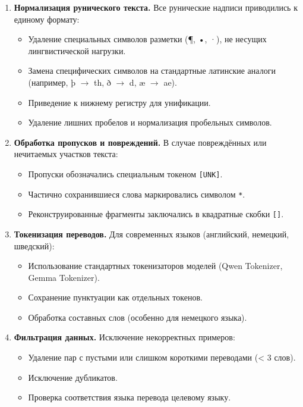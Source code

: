 \documentclass[14pt,a4paper]{extreport}
\begin{document}
\begin{enumerate}
    \item \textbf{Нормализация рунического текста.} Все рунические надписи приводились к единому формату:
    \begin{itemize}
        \item Удаление специальных символов разметки (¶, •, ·), не несущих лингвистической нагрузки.
        \item Замена специфических символов на стандартные латинские аналоги (например, þ $\to$ th, ð $\to$ d, æ $\to$ ae).
        \item Приведение к нижнему регистру для унификации.
        \item Удаление лишних пробелов и нормализация пробельных символов.
    \end{itemize}
    
    \item \textbf{Обработка пропусков и повреждений.} В случае повреждённых или нечитаемых участков текста:
    \begin{itemize}
        \item Пропуски обозначались специальным токеном \texttt{[UNK]}.
        \item Частично сохранившиеся слова маркировались символом \texttt{*}.
        \item Реконструированные фрагменты заключались в квадратные скобки \texttt{[]}.
    \end{itemize}
    
    \item \textbf{Токенизация переводов.} Для современных языков (английский, немецкий, шведский):
    \begin{itemize}
        \item Использование стандартных токенизаторов моделей (Qwen Tokenizer, Gemma Tokenizer).
        \item Сохранение пунктуации как отдельных токенов.
        \item Обработка составных слов (особенно для немецкого языка).
    \end{itemize}
    
    \item \textbf{Фильтрация данных.} Исключение некорректных примеров:
    \begin{itemize}
        \item Удаление пар с пустыми или слишком короткими переводами (< 3 слов).
        \item Исключение дубликатов.
        \item Проверка соответствия языка перевода целевому языку.
    \end{itemize}
\end{enumerate}
\end{document}
